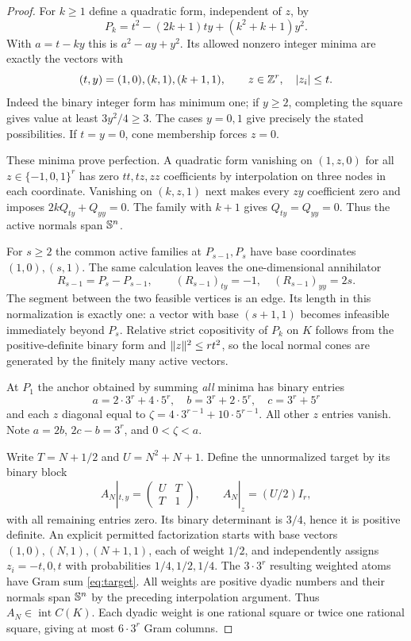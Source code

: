 \begin{proof}
For $k\ge1$ define a quadratic form, independent of $z$, by
\begin{equation}\label{eq:Pk}
 P_k=t^2-(2k+1)ty+(k^2+k+1)y^2.
\end{equation}
With $a=t-ky$ this is $a^2-ay+y^2$. Its allowed nonzero integer minima are exactly the vectors with
\begin{equation}\label{eq:minima}
 (t,y)=(1,0),(k,1),(k+1,1),\qquad z\in\mathbb Z^r,\quad |z_i|\le t.
\end{equation}
Indeed the binary integer form has minimum one; if $y\ge2$, completing the square gives value at least $3y^2/4\ge3$. The cases $y=0,1$ give precisely the stated possibilities. If $t=y=0$, cone membership forces $z=0$.

These minima prove perfection. A quadratic form vanishing on $(1,z,0)$ for all $z\in\{-1,0,1\}^r$ has zero $tt,tz,zz$ coefficients by interpolation on three nodes in each coordinate. Vanishing on $(k,z,1)$ next makes every $zy$ coefficient zero and imposes $2kQ_{ty}+Q_{yy}=0$. The family with $k+1$ gives $Q_{ty}=Q_{yy}=0$. Thus the active normals span $\mathbb S^n$.

For $s\ge2$ the common active families at $P_{s-1},P_s$ have base coordinates $(1,0),(s,1)$. The same calculation leaves the one-dimensional annihilator
\[
 R_{s-1}=P_s-P_{s-1},\qquad (R_{s-1})_{ty}=-1,\quad(R_{s-1})_{yy}=2s.
\]
The segment between the two feasible vertices is an edge. Its length in this normalization is exactly one: a vector with base $(s+1,1)$ becomes infeasible immediately beyond $P_s$. Relative strict copositivity of $P_k$ on $K$ follows from the positive-definite binary form and $\lVert z\rVert^2\le r t^2$, so the local normal cones are generated by the finitely many active vectors.

At $P_1$ the anchor obtained by summing \emph{all} minima has binary entries
\begin{equation}\label{eq:anchor}
 a=2\cdot3^r+4\cdot5^r,\quad b=3^r+2\cdot5^r,\quad c=3^r+5^r
\end{equation}
and each $z$ diagonal equal to $\zeta=4\cdot3^{r-1}+10\cdot5^{r-1}$. All other $z$ entries vanish. Note $a=2b$, $2c-b=3^r$, and $0<\zeta<a$.

Write $T=N+1/2$ and $U=N^2+N+1$. Define the unnormalized target by its binary block
\begin{equation}\label{eq:target}
 A_N|_{t,y}=\begin{pmatrix}U&T\\T&1\end{pmatrix},\qquad
 A_N|_z=(U/2)I_r,
\end{equation}
with all remaining entries zero. Its binary determinant is $3/4$, hence it is positive definite. An explicit permitted factorization starts with base vectors $(1,0),(N,1),(N+1,1)$, each of weight $1/2$, and independently assigns $z_i=-t,0,t$ with probabilities $1/4,1/2,1/4$. The $3\cdot3^r$ resulting weighted atoms have Gram sum \eqref{eq:target}. All weights are positive dyadic numbers and their normals span $\mathbb S^n$ by the preceding interpolation argument. Thus $A_N\in\operatorname{int}C(K)$. Each dyadic weight is one rational square or twice one rational square, giving at most $6\cdot3^r$ Gram columns.


\end{proof}
